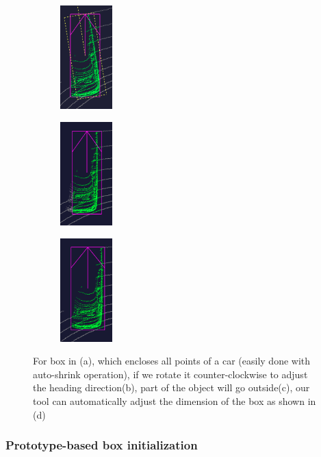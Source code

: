 \documentclass[letterpaper, 10 pt, conference]{ieeeconf}  %
\begin{document}
\begin{figure}[ht]
\begin{subfigure}[t]{0.2\linewidth}
	\end{subfigure}\hfill
	\begin{subfigure}[t]{0.2\linewidth}
		\includegraphics[height=4cm]{./figures/adjust-naively}
		\caption{}
		\label{fig:box-rotate-in-subview}
	\end{subfigure}\hfill
	\begin{subfigure}[t]{0.2\linewidth}
		\includegraphics[height=4cm]{./figures/rotate-fail}
		\caption{}
	\end{subfigure}\hfill
	\begin{subfigure}[t]{0.2\linewidth}
		\includegraphics[height=4cm]{./figures/rotate-success}
		\caption{}
	\end{subfigure}\hfill
	\caption{For box in (a), which encloses all points of a car (easily done with auto-shrink operation), if we rotate it counter-clockwise to adjust the heading direction(b), part of the object will go outside(c), our tool can automatically adjust the dimension of the box as shown in (d)}
	\label{fig:boundary-aware-rotation}
\end{figure}


\subsubsection{Prototype-based box initialization}
\end{document}
